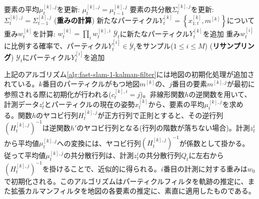 \documentclass[dvipdfmx,a4paper]{jsarticle}
\begin{document}
\begin{algorithm}
	\begin{algorithmic}[1]
					\State 要素の平均$\mu_t^{[k], j}$を更新: $\mu_t^{[k], j} = \mu_{t - 1}^{[k], j}$
					\State 要素の共分散$\Sigma_t^{[k], j}$を更新: $\Sigma_t^{[k], j} = \Sigma_{t - 1}^{[k], j}$
				\EndIf
			\EndFor
			\State (\textbf{重みの計算}) 新たなパーティクル$Y_t^{[k]} = \left\{ x_{1 : t}^{[k]}, m^{[k]} \right\}$について重み$w_t^{[k]}$を計算: $w_t^{[k]} = \prod_i w_t^{[k], i}$
			\State $\overline{\mathcal{Y}}_t$に新たなパーティクル$Y_t^{[k]}$を追加
		\EndFor
			\State 重み$w_t^{[i]}$に比例する確率で、パーティクル$Y_t^{[i]} \in \overline{\mathcal{Y}}_t$をサンプル($1 \le i \le M$)
			\State (\textbf{リサンプリング}) $\mathcal{Y}_t$にパーティクル$Y_t^{[i]}$を追加
		\EndFor
	\end{algorithmic}
\end{algorithm}

上記のアルゴリズム\ref{alg:fast-slam-1-kalman-filter}には地図の初期化処理が追加されている。$k$番目のパーティクルがもつ地図$m^{[k]}$の、$j$番目の要素$m^{[k], j}$が最初に参照される際に初期化が行われる($c_t^{[k], i} = j$)。非線形関数$h$の逆関数を用いて、計測データ$z_t^i$とパーティクルの現在の姿勢$x_t^{[k]}$から、要素の平均$\mu_t^{[k], j}$を求める。関数$h$のヤコビ行列$H_t^{[k], j}$が正方行列で正則とすると、その逆行列$\left( H_t^{[k], j} \right)^{-1}$は逆関数$h'$のヤコビ行列となる(行列の階数が落ちない場合)。計測$z_t^i$から平均値$\mu_t^{[k], j}$への変換には、ヤコビ行列$\left( H_t^{[k], j} \right)^{-1}$が係数として掛かる。従って平均値$\mu_t^{[k], j}$の共分散行列は、計測$z_t^i$の共分散行列$Q_t$に左右から$\left( H_t^{[k], j} \right)^{-1}$を掛けることで、近似的に得られる。$i$番目の計測に対する重みは$w_0$で初期化される。このアルゴリズムはパーティクルフィルタを軌跡の推定に、また拡張カルマンフィルタを地図の各要素の推定に、素直に適用したものである。



\end{document}
